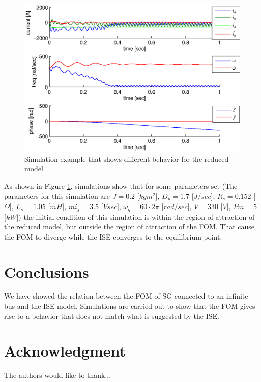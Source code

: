\documentclass[conference]{IEEEtran}
\begin{document}
\begin{figure}[ht]
\includegraphics[scale=0.6]{simDiffRegionOFAttraction}
\caption{Simulation example that shows different behavior for the 
reduced model}
\label{fig:InfBusOne1DiffRegionOfAttraction}
\end{figure}

As shown in Figure \ref{fig:InfBusOne1DiffRegionOfAttraction},
simulations show that for some parameters set (The parameters for this
simulation are $J=0.2$ {[}$kgm^{2}${]}, $D_{p}=1.7$ {[}$J/sec${]},
$R_{s}=0.152$ {[}$\Omega]$, $L_{s}=1.05$ {[}$mH${]}, $mi_{f}=3.5$
{[}$Vsec]$, $\omega_{g}=60\cdotp2\pi$ {[}$rad/sec${]}, $V=330$
{[}$V]$, $Pm=5$ {[}$kW${]}) the initial condition of this simulation
is within the region of attraction of the reduced model, but outside
the region of attraction of the FOM. That cause the FOM to diverge while the ISE converges to the
equilibrium point.


\section{Conclusions}

We have showed the relation between the FOM of SG connected
to an infinite bus and the ISE model. Simulations
are carried out to show that the FOM gives rise to
a behavior that does not match what is suggested by the ISE. 


\section*{Acknowledgment}

The authors would like to thank...
\end{document}
